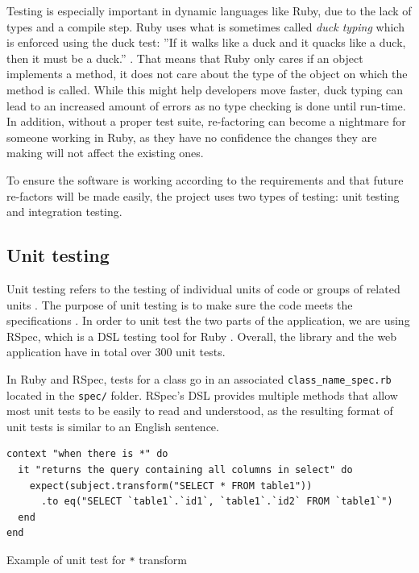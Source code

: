 Testing is especially important in dynamic languages like Ruby, due to the lack of types and a compile step. Ruby uses what is sometimes called \textit{duck typing} which is enforced using the duck test: ''If it walks like a duck and it quacks like a duck, then it must be a duck.'' \citep{wiki:duck_typing}. That means that Ruby only cares if an object implements a method, it does not care about the type of the object on which the method is called. While this might help developers move faster, duck typing can lead to an increased amount of errors as no type checking is done until run-time. In addition, without a proper test suite, re-factoring can become a nightmare for someone working in Ruby, as they have no confidence the changes they are making will not affect the existing ones.

To ensure the software is working according to the requirements and that future re-factors will be made easily, the project uses two types of testing: unit testing and integration testing.

\subsection{Unit testing}

Unit testing refers to the testing of individual units of code or groups of related units \citep{unit_testing}. The purpose of unit testing is to make sure the code meets the specifications \citep{Olan2003}. In order to unit test the two parts of the application, we are using RSpec, which is a DSL testing tool for Ruby \citep{wiki:rspec}. Overall, the library and the web application have in total over 300 unit tests.

In Ruby and RSpec, tests for a class go in an associated \texttt{class\_name\_spec.rb} located in the \texttt{spec/} folder. RSpec's DSL provides multiple methods that allow most unit tests to be easily to read and understood, as the resulting format of unit tests is similar to an English sentence.

\begin{code}
\begin{verbatim}
context "when there is *" do
  it "returns the query containing all columns in select" do
    expect(subject.transform("SELECT * FROM table1"))
      .to eq("SELECT `table1`.`id1`, `table1`.`id2` FROM `table1`")
  end
end
\end{verbatim}
\caption{Example of unit test for \texttt{*} transform}
\label{fig:example_unit_test}
\end{code}

